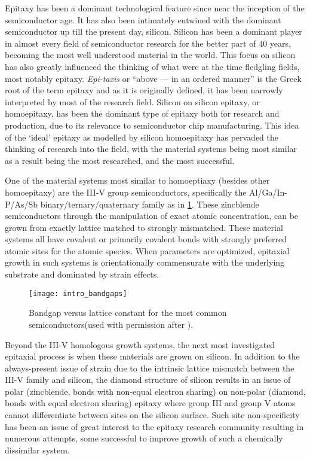 Epitaxy has been a dominant technological feature since near the inception of the semiconductor age.
It has also been intimately entwined with the dominant semiconductor up till the present day, silicon.
Silicon has been a dominant player in almost every field of semiconductor research for the better part of 40 years, becoming the most well understood material in the world.
This focus on silicon has also greatly influenced the thinking of what were at the time fledgling fields, most notably epitaxy.
\emph{Epi-taxis} or ``above --- in an ordered manner'' is the Greek root of the term epitaxy and as it is originally defined, it has been narrowly interpreted by most of the research field.
Silicon on silicon epitaxy, or homoepitaxy, has been the dominant type of epitaxy both for research and production, due to its relevance to semiconductor chip manufacturing.
This idea of the `ideal' epitaxy as modelled by silicon homoepitaxy has pervaded the thinking of research into the field, with the material systems being most similar as a result being the most researched, and the most successful.

One of the material systems most similar to homoeptiaxy (besides other homoepitaxy) are the III-V group semiconductors, specifically the Al/Ga/In-P/As/Sb bi\-nary/ter\-nary/qua\-ter\-nary family as in \cref{fig:intro_bandgaps}.
These zincblende semiconductors through the manipulation of exact atomic concentration, can be grown from exactly lattice matched to strongly mismatched.
These material systems all have covalent or primarily covalent bonds with strongly preferred atomic sites for the atomic species.
When parameters are optimized, epitaxial growth in such systems is orientationally commensurate with the underlying substrate and dominated by strain effects.
\begin{figure}
 \centering \texttt{[image: intro\_bandgaps]}
 \caption[Bandgap versus lattice constant]{\label{fig:intro_bandgaps}Bandgap versus lattice constant for the most common semiconductors(used with permission after \cite{HelmutFoll2013}).}
\end{figure}

Beyond the III-V homologous growth systems, the next most investigated epitaxial process is when these materials are grown on silicon.
In addition to the always-present issue of strain due to the intrinsic lattice mismatch between the III-V family and silicon, the diamond structure of silicon results in an issue of polar (zincblende, bonds with non-equal electron sharing) on non-polar (diamond, bonds with equal electron sharing) epitaxy\cite{Kroemer1987} where group III and group V atoms cannot differentiate between sites on the silicon surface.
Such site non-specificity has been an issue of great interest to the epitaxy research community resulting in numerous attempts, some successful\cite{Kroemer1987} to improve growth of such a chemically dissimilar system.

